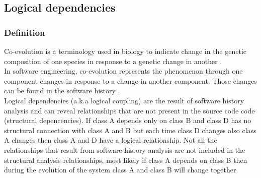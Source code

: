 \documentclass[conference,compsoc]{IEEEtran}
\begin{document}
\subsection{ Logical dependencies}
\subsubsection{ Definition }
Co-evolution is a terminology used in biology to indicate change in the genetic composition of one species in response to a genetic change in another \cite{ct5}. \\In software engineering, co-evolution represents the phenomenon through one component changes in response to a change in another component. Those changes can be found in the software history \cite{ct6}. \\  Logical dependencies (a.k.a logical coupling) are the result of software history analysis and can reveal relationships that are not present in the source code code (structural depencencies). If class A depends only on class B  and class D has no structural connection with class A and B but each time class D changes also class A changes then class A and D have a logical relationship. Not all the relationships that result from software history analysis are not included in the structural analysis relationships, most likely if class A depends on class B then during the evolution of the system class A and class B will change together.
\end{document}
